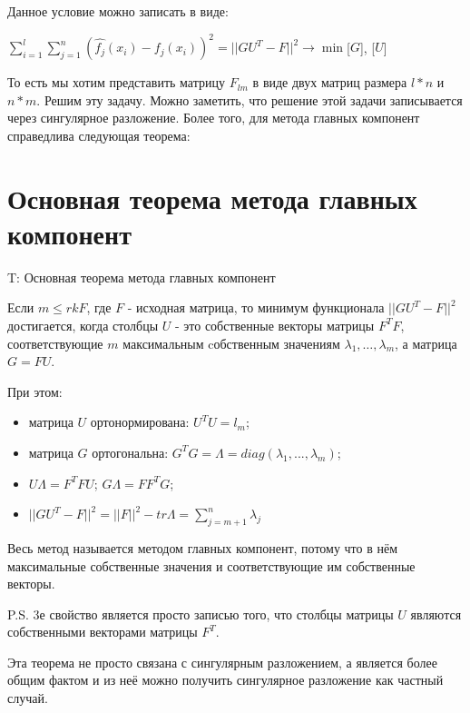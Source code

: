 Данное условие можно записать в виде: \par
$\displaystyle\sum_{i=1}^{l}\displaystyle\sum_{j=1}^{n} (\hat{f_j}(x_i)-f_j(x_i))^2 = ||GU^T - F||^2 \rightarrow \min $[$G$], [$U$]

То есть мы хотим представить матрицу $F_{lm}$ в виде двух матриц размера $l*n$ и $n*m$. Решим эту задачу. Можно заметить, что решение этой задачи записывается через сингулярное разложение. Более того, для метода главных компонент справедлива следующая теорема:\par


\section{Основная теорема метода главных компонент}

T: Основная теорема метода главных компонент\par
Если $m \le rk F$, где $F$ - исходная матрица, то минимум функционала $||GU^T - F||^2$ достигается, когда столбцы $U$ - это собственные векторы матрицы $F^TF$, соответствующие $m$ максимальным cобственным значениям $\lambda_1, \dotsc, \lambda_m$, а матрица $G = FU$. \par
При этом:
\begin{itemize}
    \item матрица $U$ ортонормирована: $U^TU = l_m$;
    \item матрица $G$ ортогональна: $G^TG = \Lambda = diag(\lambda_1,...,\lambda_m)$;
    \item $U\Lambda=F^TFU$; $G\Lambda=FF^TG$;
    \item $||GU^T-F||^2=||F||^2-tr\Lambda = \displaystyle\sum_{j=m+1}^n\lambda_j$
\end{itemize}

Весь метод называется методом главных компонент, потому что в нём максимальные  собственные значения и соответствующие им собственные векторы.\par
P.S. 3е свойство является просто записью того, что столбцы матрицы $U$ являются собственными векторами матрицы $F^T$.

Эта теорема не просто связана с сингулярным разложением, а является более общим фактом и из неё можно получить сингулярное разложение как частный случай.

